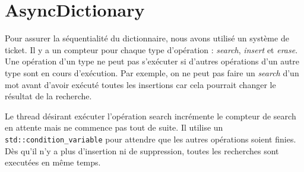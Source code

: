 \documentclass{article}
\begin{document}
\section{AsyncDictionary}
Pour assurer la séquentialité du dictionnaire, nous avons utilisé un
système de ticket.
Il y a un compteur pour chaque type d'opération : \textit{search},
\textit{insert} et \textit{erase}.
Une opération d'un type ne peut pas s'exécuter si d'autres opérations
d'un autre type sont en cours d'exécution.
Par exemple, on ne peut pas faire un \textit{search} d'un mot avant
d'avoir exécuté toutes les insertions car cela pourrait changer le
résultat de la recherche.

Le thread désirant exécuter l'opération search incrémente le compteur de
search en attente mais ne commence pas tout de suite.
Il utilise un \texttt{std::condition\_variable} pour attendre que les
autres opérations soient finies.  Dès qu'il n'y a plus d'insertion ni de
suppression, toutes les recherches sont executées en même temps.
\end{document}
